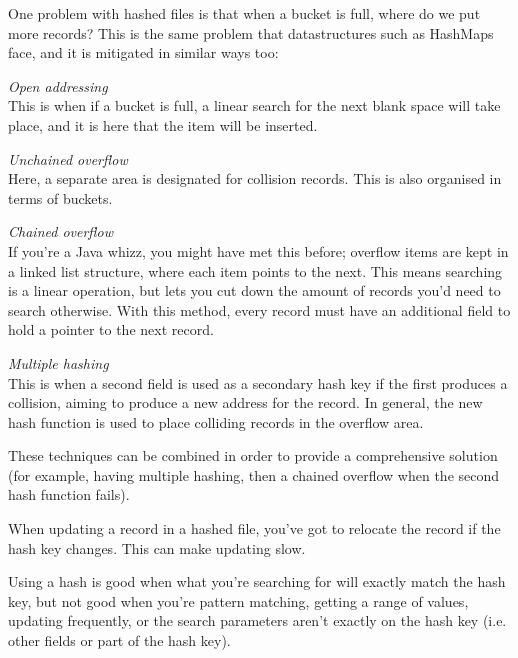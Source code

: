 \begin{description}
    One problem with hashed files is that when a bucket is full, where do we put
    more records? This is the same problem that datastructures such as HashMaps
    face, and it is mitigated in similar ways too:

    \begin{description}
      \item \textit{Open addressing}\\
        This is when if a bucket is full, a linear search for the next blank
        space will take place, and it is here that the item will be inserted.

      \item \textit{Unchained overflow}\\
        Here, a separate area is designated for collision records. This is also
        organised in terms of buckets.

      \item \textit{Chained overflow}\\
        If you're a Java whizz, you might have met this before; overflow items
        are kept in a linked list structure, where each item points to the next.
        This means searching is a linear operation, but lets you cut down the
        amount of records you'd need to search otherwise. With this method,
        every record must have an additional field to hold a pointer to the next
        record.

      \item \textit{Multiple hashing}\\
        This is when a second field is used as a secondary hash key if the first
        produces a collision, aiming to produce a new address for the record. In
        general, the new hash function is used to place colliding records in the
        overflow area.
    \end{description}

    These techniques can be combined in order to provide a comprehensive
    solution (for example, having multiple hashing, then a chained overflow when
    the second hash function fails).

    When updating a record in a hashed file, you've got to relocate the record
    if the hash key changes. This can make updating slow.

    Using a hash is good when what you're searching for will exactly match the
    hash key, but not good when you're pattern matching, getting a range of
    values, updating frequently, or the search parameters aren't exactly on the
    hash key (i.e. other fields or part of the hash key).

\end{description}

